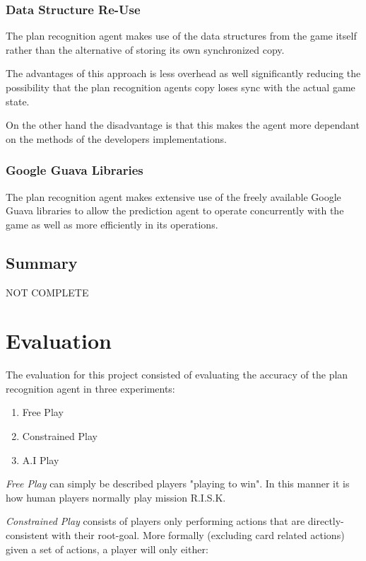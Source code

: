 \documentclass[parskip]{cs4rep}
\begin{document}
\subsection{Data Structure Re-Use}

The plan recognition agent makes use of the data structures from the game itself rather than the alternative of storing its own synchronized copy.

The advantages of this approach is less overhead as well significantly reducing the possibility that the plan recognition agents copy loses sync with the actual game state. 

On the other hand the disadvantage is that this makes the agent more dependant on the methods of the developers implementations.

\subsection{Google Guava Libraries}

The plan recognition agent makes extensive use of the freely available Google Guava libraries to allow the prediction agent to operate concurrently with the game as well as more efficiently in its operations.

\section{Summary}

NOT COMPLETE

\chapter{Evaluation} 

The evaluation for this project consisted of evaluating the accuracy of the plan recognition agent in three experiments:

\begin{enumerate}
\item
Free Play
\item
Constrained Play
\item
A.I Play
\end{enumerate}

\textit{Free Play} can simply be described players "playing to win". In this manner it is how human players normally play mission R.I.S.K.

\textit{Constrained Play} consists of players only performing actions that are directly-consistent with their root-goal.  More formally (excluding card related actions) given a set of actions, a player will only either:
\end{document}
